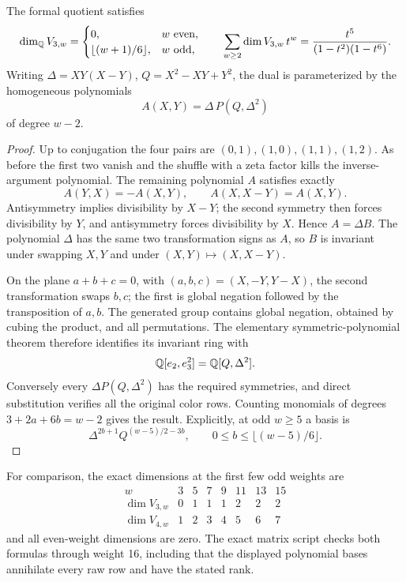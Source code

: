 \begin{theorem}\label{thm:level-three}
The formal quotient satisfies
\[
 \dim_\mathbb Q V_{3,w}=
 \begin{cases}
 0,&w\ \text{even},\\
 \lfloor(w+1)/6\rfloor,&w\ \text{odd},
 \end{cases}
 \qquad
 \sum_{w\geq2}\dim V_{3,w}\,t^w
       =\frac{t^5}{(1-t^2)(1-t^6)}.
\]
Writing \(\Delta=XY(X-Y)\), \(Q=X^2-XY+Y^2\), the dual is parameterized
by the homogeneous polynomials
\[
 A(X,Y)=\Delta\,P(Q,\Delta^2)
\]
of degree \(w-2\).
\end{theorem}

\begin{proof}
Up to conjugation the four pairs are
\((0,1),(1,0),(1,1),(1,2)\).
As before the first two vanish and the shuffle with a zeta factor kills
the inverse-argument polynomial. The remaining polynomial \(A\)
satisfies exactly
\[
 A(Y,X)=-A(X,Y),\qquad A(X,X-Y)=A(X,Y).
\]
Antisymmetry implies divisibility by \(X-Y\); the second symmetry then
forces divisibility by \(Y\), and antisymmetry forces divisibility by
\(X\). Hence \(A=\Delta B\). The polynomial \(\Delta\) has the same
two transformation signs as \(A\), so \(B\) is invariant under swapping
\(X,Y\) and under \((X,Y)\mapsto(X,X-Y)\).

On the plane \(a+b+c=0\), with
\((a,b,c)=(X,-Y,Y-X)\), the second transformation swaps \(b,c\);
the first is global negation followed by the transposition of \(a,b\).
The generated group contains global negation, obtained by cubing
the product, and all permutations. The elementary symmetric-polynomial
theorem therefore identifies its invariant ring with
\[
 \mathbb Q[e_2,e_3^2]=\mathbb Q[Q,\Delta^2].
\]
Conversely every \(\Delta P(Q,\Delta^2)\) has the required symmetries,
and direct substitution verifies all the original color rows.
Counting monomials of degrees \(3+2a+6b=w-2\) gives the result.
Explicitly, at odd \(w\geq5\) a basis is
\[
 \Delta^{2b+1}Q^{(w-5)/2-3b},
 \qquad 0\leq b\leq\lfloor(w-5)/6\rfloor .
\]
\end{proof}

For comparison, the exact dimensions at the first few odd weights are
\[
\begin{array}{c|rrrrrrr}
 w&3&5&7&9&11&13&15\\ \hline
 \dim V_{3,w}&0&1&1&1&2&2&2\\
 \dim V_{4,w}&1&2&3&4&5&6&7
\end{array}
\]
and all even-weight dimensions are zero. The exact matrix script
checks both formulas through weight 16, including that the displayed
polynomial bases annihilate every raw row and have the stated rank.

